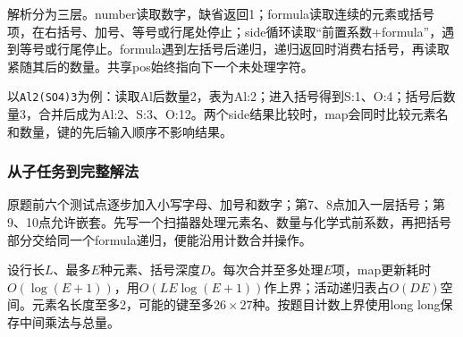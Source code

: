 \documentclass[UTF8,11pt,a4paper,fontset=none]{ctexart}
\begin{document}
解析分为三层。number读取数字，缺省返回1；formula读取连续的元素或括号项，在右括号、加号、等号或行尾处停止；side循环读取“前置系数+formula”，遇到等号或行尾停止。formula遇到左括号后递归，递归返回时消费右括号，再读取紧随其后的数量。共享pos始终指向下一个未处理字符。

以\texttt{Al2(SO4)3}为例：读取Al后数量2，表为Al:2；进入括号得到S:1、O:4；括号后数量3，合并后成为Al:2、S:3、O:12。两个side结果比较时，map会同时比较元素名和数量，键的先后输入顺序不影响结果。

\subsubsection{从子任务到完整解法}
原题前六个测试点逐步加入小写字母、加号和数字；第7、8点加入一层括号；第9、10点允许嵌套。先写一个扫描器处理元素名、数量与化学式前系数，再把括号部分交给同一个formula递归，便能沿用计数合并操作。

设行长$L$、最多$E$种元素、括号深度$D$。每次合并至多处理$E$项，map更新耗时$O(\log(E+1))$，用$O(LE\log(E+1))$作上界；活动递归表占$O(DE)$空间。元素名长度至多2，可能的键至多$26\times27$种。按题目计数上界使用long long保存中间乘法与总量。
\end{document}
